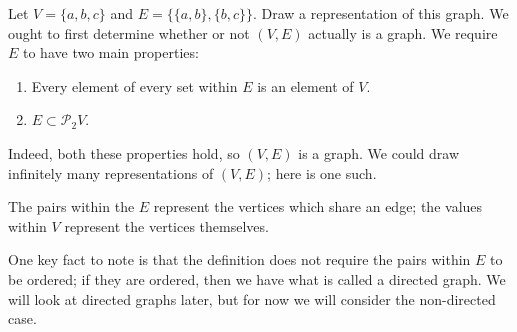 \begin{example}{Let $V=\{a,b,c\}$ and $E=\{\{a,b\},\{b,c\}\}$. Draw a representation of this graph.}
    We ought to first determine whether or not $(V,E)$ actually is a graph.
    We require $E$ to have two main properties:

    \begin{enumerate}
        \item Every element of every set within $E$ is an element of $V$.
        \item $E\subset\mathcal{P}_{2}{V}$.
    \end{enumerate}

    Indeed, both these properties hold, so $(V,E)$ is a graph.
    We could draw infinitely many representations of $(V,E)$; here is one such.
    \begin{center}
    \end{center}
    The pairs within the $E$ represent the vertices which share an edge; the values within $V$ represent the vertices themselves.
\end{example}

One key fact to note is that the definition does not require the pairs within $E$ to be ordered; if they are ordered, then we have what is called a directed graph.
We will look at directed graphs later, but for now we will consider the non-directed case.
